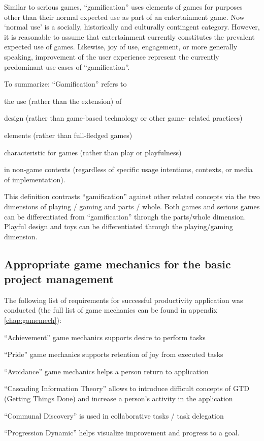 Similar to serious games, ``gamification'' uses elements of games for purposes other than their normal expected use as part of an entertainment game. Now `normal use' is a socially, historically and culturally contingent category. However, it is reasonable to assume that entertainment currently constitutes the prevalent expected use of games. Likewise, joy of use, engagement, or more generally speaking, improvement of the user experience represent the currently predominant use cases of ``gamification''.

To summarize: ``Gamification'' refers to
\begin{compactitem}
\item the use (rather than the extension) of
\item design (rather than game-based technology or other game-
related practices)
\item elements (rather than full-fledged games)
\item characteristic for games (rather than play or playfulness)
\item in non-game contexts (regardless of specific usage intentions, contexts, or media of implementation).
\end{compactitem}


This definition contrasts ``gamification'' against other related concepts via the two dimensions of playing / gaming and parts / whole. Both games and serious games can be differentiated from ``gamification'' through the parts/whole dimension. Playful design and toys can be differentiated through the playing/gaming dimension.


\subsection{Appropriate game mechanics for the basic project management}

The following list of requirements for successful productivity application was conducted (the full list of game mechanics can be found in appendix \ref{chap:gamemech}):

\begin{compactitem}
\item ``Achievement'' game mechanics supports desire to perform tasks
\item ``Pride'' game mechanics supports retention of joy from executed tasks
\item ``Avoidance'' game mechanics helps a person return to application
\item ``Cascading Information Theory'' allows to introduce difficult concepts of GTD (Getting Things Done) and increase a person’s activity in the application
\item ``Communal Discovery'' is used in collaborative tasks / task delegation
\item ``Progression Dynamic'' helps visualize improvement and progress to a goal.
\end{compactitem}


